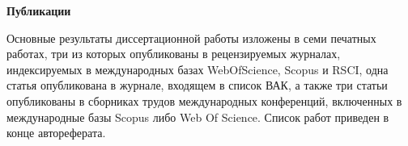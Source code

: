 
\newpage
\textbf{Публикации}

Основные результаты диссертационной работы изложены в семи печатных работах, три из которых опубликованы в рецензируемых журналах, индексируемых в международных базах WebOfScience, Scopus и RSCI, одна статья опубликована в журнале, входящем в список ВАК, а также три статьи опубликованы в сборниках трудов международных конференций, включенных в международные базы Scopus либо Web Of Science. Список работ приведен в конце автореферата.